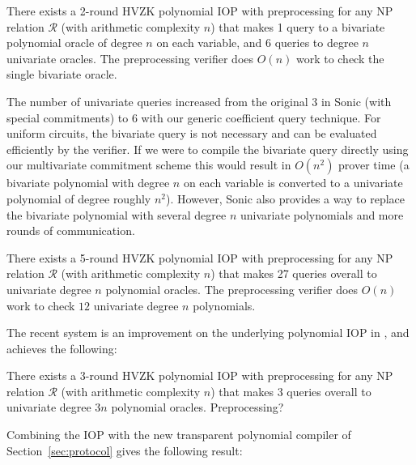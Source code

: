 \begin{theorem}
There exists a 2-round HVZK polynomial IOP with preprocessing for any NP relation $\mathcal{R}$ (with arithmetic complexity $n$) that makes 1 query to a bivariate polynomial oracle of degree $n$ on each variable, and 6 queries to degree $n$ univariate oracles. The preprocessing verifier does $O(n)$ work to check the single bivariate oracle. 
\end{theorem}

The number of univariate queries increased from the original $3$ in \textsf{Sonic} (with special commitments) to $6$ with our generic coefficient query technique. For uniform circuits, the bivariate query is not necessary and can be evaluated efficiently by the verifier. If we were to compile the bivariate query directly using our multivariate commitment scheme this would result in $O(n^2)$ prover time (a bivariate polynomial with degree $n$ on each variable is converted to a univariate polynomial of degree roughly $n^2$). However, \textsf{Sonic} also provides a way to replace the bivariate polynomial with several degree $n$ univariate polynomials and more rounds of communication. 

\begin{theorem}\label{thm:sonic} 
There exists a 5-round HVZK polynomial IOP with preprocessing for any NP relation $\mathcal{R}$ (with arithmetic complexity $n$) that makes 27 queries overall to univariate degree $n$ polynomial oracles. The preprocessing verifier does $O(n)$ work to check $12$ univariate degree $n$ polynomials. 
\end{theorem}


The recent system  is an improvement on the underlying polynomial IOP in , and achieves the following: 

\begin{theorem} 
There exists a 3-round HVZK polynomial IOP with preprocessing for any NP relation $\mathcal{R}$ (with arithmetic complexity $n$) that makes 3 queries overall to univariate degree $3n$ polynomial oracles. Preprocessing? %
\end{theorem}

Combining the  IOP with the new transparent polynomial compiler of Section~\ref{sec:protocol} gives the following result:  


